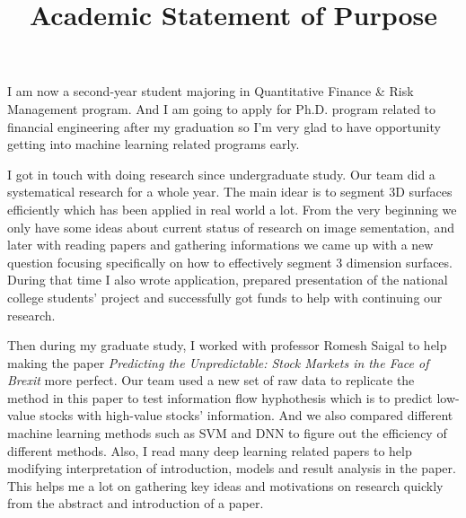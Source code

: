 \documentclass[a4paper,12pt]{article}
\title{Academic Statement of Purpose}
\begin{document}
\maketitle

\thispagestyle{fancy}%
I am now a second-year student majoring in Quantitative Finance \& Risk Management program. And I am going to apply for Ph.D. program related to financial engineering after my graduation so I'm very glad to have opportunity getting into machine learning related programs early.

I got in touch with doing research since undergraduate study. Our team did a systematical research for a whole year. The main idear is to segment 3D surfaces efficiently which has been applied in real world a lot. From the very beginning we only have some ideas about current status of research on image sementation, and later with reading papers and gathering informations we came up with a new question focusing specifically on how to effectively segment 3 dimension surfaces. During that time I also wrote application, prepared presentation of the national college students' project and successfully got funds to help with continuing our research.

Then during my graduate study, I worked with professor Romesh Saigal to help making the paper \emph{Predicting the Unpredictable: Stock Markets in the Face of Brexit} more perfect. Our team used a new set of raw data to replicate the method in this paper to test information flow hyphothesis which is to predict low-value stocks with high-value stocks' information. And we also compared different machine learning methods such as SVM and DNN to figure out the efficiency of different methods. Also, I read many deep learning related papers to help modifying interpretation of introduction, models and result analysis in the paper. This helps me a lot on gathering key ideas and motivations on research quickly from the abstract and introduction of a paper.
\end{document}

